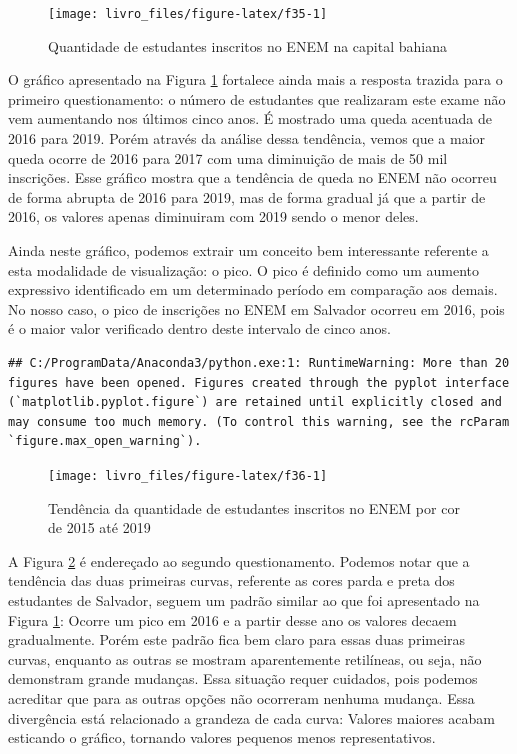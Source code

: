 \documentclass[
  oneside]{book}
\begin{document}
\begin{figure}

{\centering \texttt{[image: livro\_files/figure-latex/f35-1]} 

}

\caption{Quantidade de estudantes inscritos no ENEM na capital bahiana}\label{fig:f35}
\end{figure}

O gráfico apresentado na Figura \ref{fig:f35} fortalece ainda mais a resposta trazida para o primeiro questionamento: o número de estudantes que realizaram este exame não vem aumentando nos últimos cinco anos. É mostrado uma queda acentuada de 2016 para 2019. Porém através da análise dessa tendência, vemos que a maior queda ocorre de 2016 para 2017 com uma diminuição de mais de 50 mil inscrições. Esse gráfico mostra que a tendência de queda no ENEM não ocorreu de forma abrupta de 2016 para 2019, mas de forma gradual já que a partir de 2016, os valores apenas diminuiram com 2019 sendo o menor deles.

Ainda neste gráfico, podemos extrair um conceito bem interessante referente a esta modalidade de visualização: o pico. O pico é definido como um aumento expressivo identificado em um determinado período em comparação aos demais. No nosso caso, o pico de inscrições no ENEM em Salvador ocorreu em 2016, pois é o maior valor verificado dentro deste intervalo de cinco anos.

\begin{verbatim}
## C:/ProgramData/Anaconda3/python.exe:1: RuntimeWarning: More than 20 figures have been opened. Figures created through the pyplot interface (`matplotlib.pyplot.figure`) are retained until explicitly closed and may consume too much memory. (To control this warning, see the rcParam `figure.max_open_warning`).
\end{verbatim}

\begin{figure}

{\centering \texttt{[image: livro\_files/figure-latex/f36-1]} 

}

\caption{Tendência da quantidade de estudantes inscritos no ENEM por cor de 2015 até 2019}\label{fig:f36}
\end{figure}

A Figura \ref{fig:f36} é endereçado ao segundo questionamento. Podemos notar que a tendência das duas primeiras curvas, referente as cores parda e preta dos estudantes de Salvador, seguem um padrão similar ao que foi apresentado na Figura \ref{fig:f35}: Ocorre um pico em 2016 e a partir desse ano os valores decaem gradualmente. Porém este padrão fica bem claro para essas duas primeiras curvas, enquanto as outras se mostram aparentemente retilíneas, ou seja, não demonstram grande mudanças. Essa situação requer cuidados, pois podemos acreditar que para as outras opções não ocorreram nenhuma mudança. Essa divergência está relacionado a grandeza de cada curva: Valores maiores acabam esticando o gráfico, tornando valores pequenos menos representativos.
\end{document}
